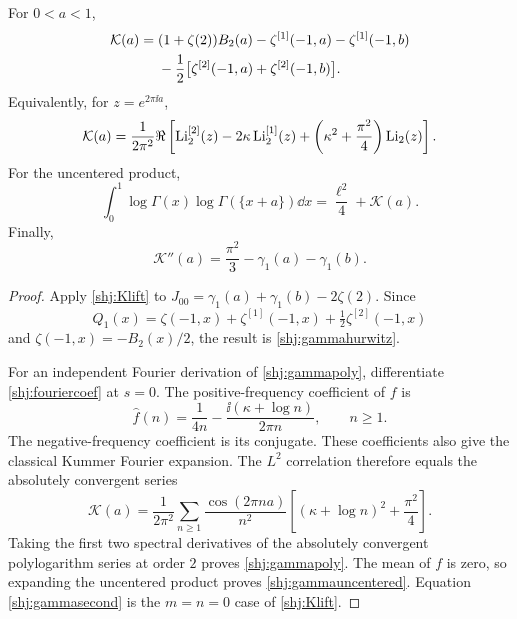 \begin{theorem}\label{shj:gammathm}
For $0<a<1$,
\begin{align}
\mathcal K(a)={}&(1+\zeta(2))B_2(a)
-\zeta^{[1]}(-1,a)-\zeta^{[1]}(-1,b)\notag\\
&-\frac12\big[\zeta^{[2]}(-1,a)+\zeta^{[2]}(-1,b)\big].
\label{shj:gammahurwitz}
\end{align}
Equivalently, for $z=e^{2\pi\ii a}$,
\begin{equation}\label{shj:gammapoly}
\mathcal K(a)=\frac1{2\pi^2}\Re\left[
\operatorname{Li}_2^{[2]}(z)-2\kappa\operatorname{Li}_2^{[1]}(z)
+\left(\kappa^2+\frac{\pi^2}{4}\right)\operatorname{Li}_2(z)\right].
\end{equation}
For the uncentered product,
\begin{equation}\label{shj:gammauncentered}
\int_0^1\log\Gamma(x)\log\Gamma(\{x+a\})\dd x
=\frac{\ell^2}{4}+\mathcal K(a).
\end{equation}
Finally,
\begin{equation}\label{shj:gammasecond}
\mathcal K''(a)=\frac{\pi^2}{3}-\gamma_1(a)-\gamma_1(b).
\end{equation}
\end{theorem}
\begin{proof}
Apply \eqref{shj:Klift} to $J_{00}=\gamma_1(a)+\gamma_1(b)-2\zeta(2)$. Since
\[
Q_1(x)=\zeta(-1,x)+\zeta^{[1]}(-1,x)+\tfrac12\zeta^{[2]}(-1,x)
\]
and $\zeta(-1,x)=-B_2(x)/2$, the result is \eqref{shj:gammahurwitz}.

For an independent Fourier derivation of \eqref{shj:gammapoly}, differentiate \eqref{shj:fouriercoef} at $s=0$. The positive-frequency coefficient of $f$ is
\[
\widehat f(n)=\frac1{4n}-\frac{\ii(\kappa+\log n)}{2\pi n},\qquad n\ge1.
\]
The negative-frequency coefficient is its conjugate. These coefficients also give the classical Kummer Fourier expansion. The $L^2$ correlation therefore equals the absolutely convergent series
\begin{equation}\label{shj:gammafourier}
\mathcal K(a)=\frac1{2\pi^2}\sum_{n\ge1}
\frac{\cos(2\pi na)}{n^2}
\left[(\kappa+\log n)^2+\frac{\pi^2}{4}\right].
\end{equation}
Taking the first two spectral derivatives of the absolutely convergent polylogarithm series at order $2$ proves \eqref{shj:gammapoly}. The mean of $f$ is zero, so expanding the uncentered product proves \eqref{shj:gammauncentered}. Equation \eqref{shj:gammasecond} is the $m=n=0$ case of \eqref{shj:Klift}.
\end{proof}

